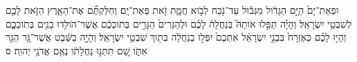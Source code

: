 \documentclass{openreader}
\begin{document}
וּפְאַת־יָם֙ הַיָּ֣ם הַגָּדֹ֔ול מִגְּב֕וּל עַד־נֹ֖כַח לְבֹ֣וא חֲמָ֑ת זֹ֖את פְּאַת־יָֽם׃ 
וְחִלַּקְתֶּ֞ם אֶת־הָאָ֧רֶץ הַזֹּ֛את לָכֶ֖ם לְשִׁבְטֵ֥י יִשְׂרָאֵֽל׃ 
וְהָיָ֗ה תַּפִּ֣לוּ אֹותָהּ֮ בְּנַחֲלָה֒ לָכֶ֗ם וּלְהַגֵּרִים֙ הַגָּרִ֣ים בְּתֹוכְכֶ֔ם אֲשֶׁר־הֹולִ֥דוּ בָנִ֖ים בְּתֹֽוכְכֶ֑ם וְהָי֣וּ לָכֶ֗ם כְּאֶזְרָח֙ בִּבְנֵ֣י יִשְׂרָאֵ֔ל אִתְּכֶם֙ יִפְּל֣וּ בְנַחֲלָ֔ה בְּתֹ֖וךְ שִׁבְטֵ֥י יִשְׂרָאֵֽל׃ 
וְהָיָ֣ה בַשֵּׁ֔בֶט אֲשֶׁר־גָּ֥ר הַגֵּ֖ר אִתֹּ֑ו שָׁ֚ם תִּתְּנ֣וּ נַחֲלָתֹ֔ו נְאֻ֖ם אֲדֹנָ֥י יְהוִֽה׃ ס 
\end{document}
